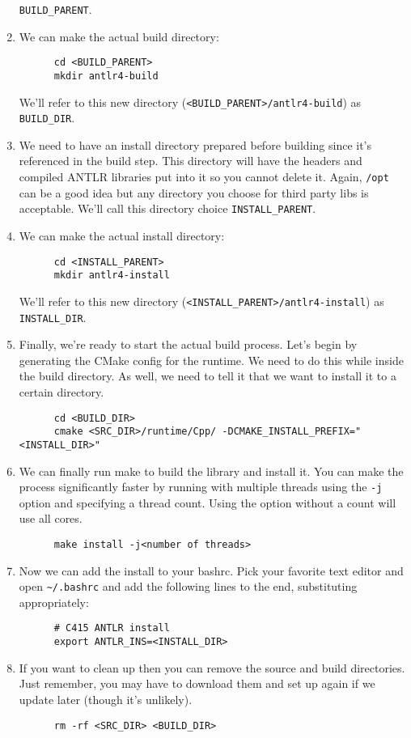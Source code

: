 \documentclass[../setup.tex]{subfiles}
\begin{document}
\begin{enumerate}
    \lstinline{BUILD_PARENT}.
  \item
    We can make the actual build directory:
    \begin{lstlisting}
      cd <BUILD_PARENT>
      mkdir antlr4-build
    \end{lstlisting}
    We'll refer to this new directory (\lstinline{<BUILD_PARENT>/antlr4-build}) as
    \lstinline{BUILD_DIR}.
  \item
    We need to have an install directory prepared before building since it's referenced in the
    build step. This directory will have the headers and compiled ANTLR libraries put into it so
    you cannot delete it. Again, \lstinline{/opt} can be a good idea but any directory you choose
    for third party libs is acceptable. We'll call this directory choice
    \lstinline{INSTALL_PARENT}.
  \item
    We can make the actual install directory:
    \begin{lstlisting}
      cd <INSTALL_PARENT>
      mkdir antlr4-install
    \end{lstlisting}
    We'll refer to this new directory (\lstinline{<INSTALL_PARENT>/antlr4-install}) as
    \lstinline{INSTALL_DIR}.
  \item
    Finally, we're ready to start the actual build process. Let's begin by generating the CMake
    config for the runtime. We need to do this while inside the build directory. As well, we need
    to tell it that we want to install it to a certain directory.
    \begin{lstlisting}
      cd <BUILD_DIR>
      cmake <SRC_DIR>/runtime/Cpp/ -DCMAKE_INSTALL_PREFIX="<INSTALL_DIR>"
    \end{lstlisting}
  \item
    We can finally run make to build the library and install it. You can make the process
    significantly faster by running with multiple threads using the \lstinline{-j} option and
    specifying a thread count. Using the option without a count will use all cores.
    \begin{lstlisting}
      make install -j<number of threads>
    \end{lstlisting}
  \item
    Now we can add the install to your bashrc. Pick your favorite text editor and open
    \lstinline{~/.bashrc} and add the following lines to the end, substituting appropriately:
    \begin{lstlisting}
      # C415 ANTLR install
      export ANTLR_INS=<INSTALL_DIR>
    \end{lstlisting}
  \item
    If you want to clean up then you can remove the source and build directories. Just remember,
    you may have to download them and set up again if we update later (though it's unlikely).
    \begin{lstlisting}
      rm -rf <SRC_DIR> <BUILD_DIR>
    \end{lstlisting}
\end{enumerate}
\end{document}
